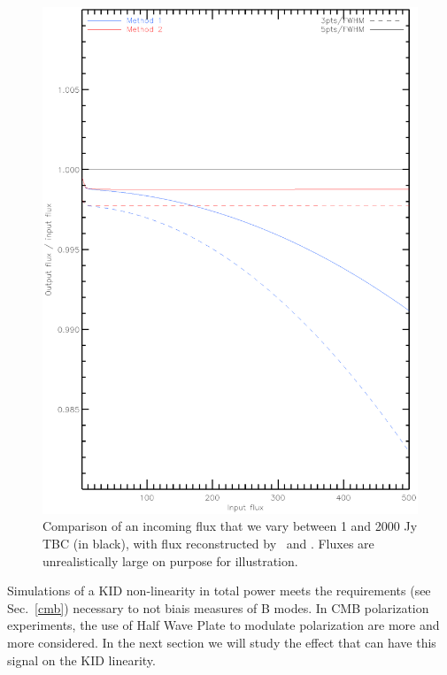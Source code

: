 \begin{figure}
  \includegraphics[clip, angle=0, width=\columnwidth]{Figures/flux_out_vs_in.eps}
  \caption{Comparison of an incoming flux that we vary between 1 and 2000 Jy TBC (in black), with flux reconstructed by \methodu\ and \methodd. Fluxes are unrealistically large on purpose for illustration. }
  \label{fig:flux_out_vs_in}
\end{figure}


Simulations of a KID non-linearity in total power meets the requirements (see Sec.~\ref{cmb}) necessary to not biais measures of B modes. In CMB polarization experiments, the use of Half Wave Plate to modulate polarization are more and more considered. In the next section we will study the effect that can have this signal on the KID linearity.


